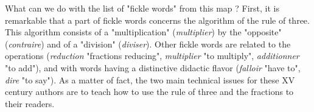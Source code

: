 \documentclass[preprint]{elsarticle}
\begin{document}
 What can we do with the list of "fickle words" from this map ? First, it is remarkable that a part of fickle words concerns the algorithm of the rule of three. This algorithm  consists of a "multiplication" (\textit{multiplier}) by the "opposite" (\textit{contraire}) and of a "division" (\textit{diviser}). Other fickle words are related to the operations (\textit{reduction} "fractions reducing", \textit{multiplier} "to multiply", \textit{additionner} "to add"), and with words having a distinctive didactic flavor (\textit{falloir} "have to", \textit{dire} "to say"). 
As a matter of fact, the two main technical issues for these XV century authors are to teach how to use the rule of three and the fractions to their readers.

\setlength{\tabcolsep}{1mm}
\setlength{\arrayrulewidth}{1pt}
\end{document}
